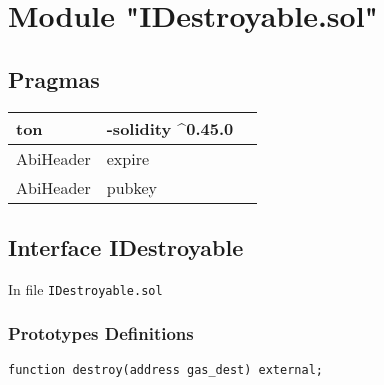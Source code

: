 
\section{Module "IDestroyable.sol"}


\subsection{Pragmas}


\noindent\begin{tabular}{|l|l|p{5cm}|}\hline
ton & -solidity \^{}0.45.0 &\\\hline
AbiHeader &  expire &\\\hline
AbiHeader &  pubkey &\\\hline
\end{tabular}


\subsection{Interface IDestroyable}


In file {\tt IDestroyable.sol}

\subsubsection{Prototypes Definitions}

\vspace{2cm}

\begin{lstlisting}[firstnumber=7]
    function destroy(address gas_dest) external;
\end{lstlisting}
